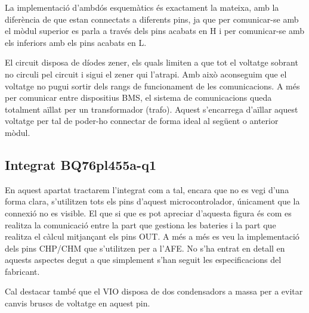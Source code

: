 \newpage 

La implementació d'ambdós esquemàtics és exactament la mateixa, amb la diferència de que estan connectats a diferents pins, ja que per comunicar-se amb el mòdul superior es parla a través dels pins acabats en H i per comunicar-se amb els inferiors amb els pins acabats en L. 

El circuit disposa de díodes zener, els quals limiten a que tot el voltatge sobrant no circuli pel circuit i sigui el zener qui l'atrapi. Amb això aconseguim que el voltatge no pugui sortir dels rangs de funcionament de les comunicacions. A més per comunicar entre dispositius BMS, el sistema de comunicacions queda totalment aïllat per un transformador (trafo). Aquest s'encarrega d'aïllar aquest voltatge per tal de poder-ho connectar de forma ideal al següent o anterior mòdul.

\subsection{Integrat BQ76pl455a-q1}

En aquest apartat tractarem l'integrat com a tal, encara que no es vegi d'una forma clara, s'utilitzen tots els pins d'aquest microcontrolador, \newline únicament que la connexió no es visible. El que si que es pot apreciar d'aquesta figura és com es realitza la comunicació entre la part que gestiona les bateries i la part que realitza el càlcul mitjançant els pins OUT. A més a més es veu la implementació dels pins CHP/CHM que s'utilitzen per a l'AFE. No s'ha entrat en detall en aquests aspectes degut a que simplement s'han seguit les especificacions del fabricant.

Cal destacar també que el VIO disposa de dos condensadors a massa per a evitar canvis bruscs de voltatge en aquest pin. 

